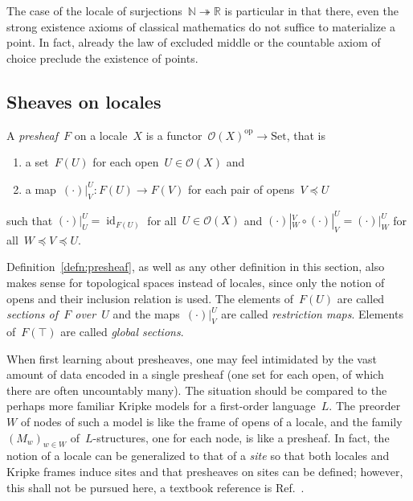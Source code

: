 \documentclass{ws-rv9x6}
\renewcommand{\O}{\mathcal{O}}
\newcommand{\NN}{\mathbb{N}}
\newcommand{\RR}{\mathbb{R}}
\newcommand{\op}{\mathrm{op}}
\newcommand{\Set}{\mathrm{Set}}
\renewcommand{\_}{\mathpunct{.}}
\newcommand{\?}{\,{:}\,}
\begin{document}
\begin{remark}The case of the locale of surjections~$\NN \twoheadrightarrow
\RR$ is particular in that there, even the strong existence axioms of
classical mathematics do not suffice to materialize a point. In fact, already
the law of excluded middle or the countable axiom of choice preclude the
existence of points.
\end{remark}


\subsection{Sheaves on locales}
\label{sect:sheaves}

\begin{definition}\label{defn:presheaf}
A \emph{presheaf}~$F$ on a locale~$X$ is a functor~$\O(X)^\op \to \Set$, that is
\begin{enumerate}
  \item a set~$F(U)$ for each open~$U \in \O(X)$ and
  \item a map~$(\cdot)|^U_V : F(U) \to F(V)$ for each pair of opens~$V \preceq U$
\end{enumerate}
such that $(\cdot)|^U_U = \operatorname{id}_{F(U)}$ for all~$U \in \O(X)$ and
$(\cdot)|^V_W \circ (\cdot)|^U_V = (\cdot)|^U_W$ for all~$W \preceq V
\preceq U$.\end{definition}

Definition~\ref{defn:presheaf}, as well as any other definition in this section,
also makes sense for topological spaces instead of locales, since only the
notion of opens and their inclusion relation is used. The elements of~$F(U)$ are
called \emph{sections of~$F$ over~$U$} and the maps~$(\cdot)|^U_V$
are called \emph{restriction maps}. Elements of~$F(\top)$ are called
\emph{global sections}.

When first learning about presheaves, one may feel intimidated by the vast
amount of data encoded in a single presheaf (one set for each open, of which there are often uncountably many). The
situation should be compared to the perhaps more familiar Kripke models for a first-order language~$L$. The
preorder~$W$ of nodes of such a model is like the frame of opens of a locale, and the
family~$(M_w)_{w \in W}$ of~$L$-structures, one for each node, is like a
presheaf. In fact, the notion of a locale can be generalized to that of a
\emph{site} so that both locales and Kripke frames induce sites and that
presheaves on sites can be defined; however, this shall not be pursued here,
a textbook reference is Ref.~.
\end{document}
